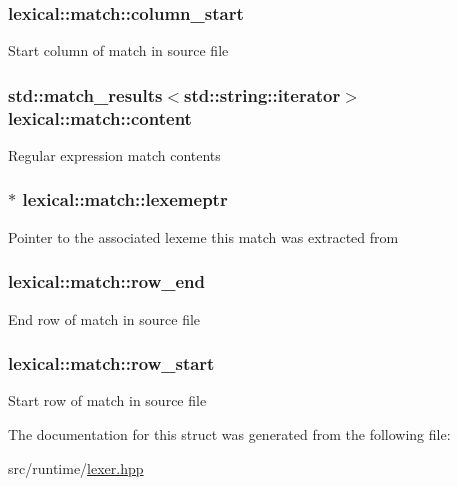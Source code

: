 \subsubsection[{\texorpdfstring{column\+\_\+start}{column_start}}]{ lexical\+::match\+::column\+\_\+start}\hypertarget{structlexical_1_1match_a3a1754ba678051a508ee2889c4a5f4eb}{}\label{structlexical_1_1match_a3a1754ba678051a508ee2889c4a5f4eb}
Start column of match in source file 
\subsubsection[{\texorpdfstring{content}{content}}]{\setlength{\rightskip}{0pt plus 5cm}std\+::match\+\_\+results$<$std\+::string\+::iterator$>$ lexical\+::match\+::content}\hypertarget{structlexical_1_1match_a2ebda7888d347b3de302ffc465755f07}{}\label{structlexical_1_1match_a2ebda7888d347b3de302ffc465755f07}
Regular expression match contents 
\subsubsection[{\texorpdfstring{lexemeptr}{lexemeptr}}]{$\ast$ lexical\+::match\+::lexemeptr}\hypertarget{structlexical_1_1match_a346ef13017b47ee41a6abe643e5732e1}{}\label{structlexical_1_1match_a346ef13017b47ee41a6abe643e5732e1}
Pointer to the associated lexeme this match was extracted from 
\subsubsection[{\texorpdfstring{row\+\_\+end}{row_end}}]{ lexical\+::match\+::row\+\_\+end}\hypertarget{structlexical_1_1match_abf7eca2de9cee016df02265a38666486}{}\label{structlexical_1_1match_abf7eca2de9cee016df02265a38666486}
End row of match in source file 
\subsubsection[{\texorpdfstring{row\+\_\+start}{row_start}}]{ lexical\+::match\+::row\+\_\+start}\hypertarget{structlexical_1_1match_a854a8828680bbfc08aa214e875ba5514}{}\label{structlexical_1_1match_a854a8828680bbfc08aa214e875ba5514}
Start row of match in source file 

The documentation for this struct was generated from the following file\+:\begin{DoxyCompactItemize}
\item 
src/runtime/\hyperlink{lexer_8hpp}{lexer.\+hpp}\end{DoxyCompactItemize}
